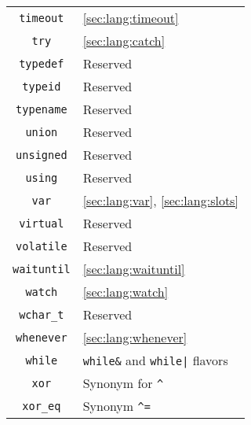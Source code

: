 \begin{tabular}{|c|l|}
 \lstinline"timeout" & \autoref{sec:lang:timeout}               \\
     \lstinline"try" & \autoref{sec:lang:catch}                 \\
 \lstinline"typedef" & Reserved                                 \\
  \lstinline"typeid" & Reserved                                 \\
\lstinline"typename" & Reserved                                 \\
   \lstinline"union" & Reserved                                 \\
\lstinline"unsigned" & Reserved                                 \\
   \lstinline"using" & Reserved                                 \\
     \lstinline"var" & \autoref{sec:lang:var}, \autoref{sec:lang:slots} \\
 \lstinline"virtual" & Reserved                                 \\
\lstinline"volatile" & Reserved                                 \\
\lstinline"waituntil" & \autoref{sec:lang:waituntil}             \\
   \lstinline"watch" & \autoref{sec:lang:watch}                 \\
 \lstinline"wchar_t" & Reserved                                 \\
\lstinline"whenever" & \autoref{sec:lang:whenever}              \\
   \lstinline"while" & \verb|while&| and \verb-while|- flavors  \\
     \lstinline"xor" & Synonym for \verb|^|                     \\
  \lstinline"xor_eq" & Synonym \verb|^=|                        \\
  \hline
\end{tabular}
\fi
